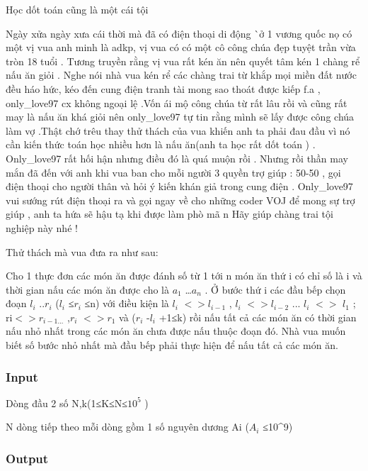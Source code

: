 



   Học dốt toán cũng là một cái tội  



   Ngày xửa ngày xưa cái thời mà đã có điện thoại di động ^^ ở 1 vương quốc nọ có một vị vua anh minh là adkp, vị vua có có một cô công chúa đẹp tuyệt trần vừa tròn 18 tuổi . Tương truyền rằng vị vua rất kén ăn nên quyết tâm kén 1 chàng rể nấu ăn giỏi . Nghe nói nhà vua kén rể các chàng trai từ khắp mọi miền đất nước đều háo hức, kéo đến cung điện tranh tài mong sao thoát được kiếp f.a , only\_love97 cx không ngoại lệ .Vốn ái mộ công chúa từ rất lâu rồi và cũng rất may là nấu ăn khá giỏi nên only\_love97 tự tin rằng mình sẽ lấy được công chúa làm vợ .Thật chớ trêu thay thử thách của vua khiến anh ta phải đau đầu vì nó cần kiến thức toán học nhiều hơn là nấu ăn(anh ta học rất dốt toán ) . Only\_love97 rất hối hận nhưng điều đó là quá muộn rồi . Nhưng rồi thần may mắn đã đến với anh khi vua ban cho mỗi người 3 quyền trợ giúp : 50-50 , gọi điện thoại cho người thân và hỏi ý kiến khán giả trong cung điện . Only\_love97 vui sướng rút điện thoại ra và gọi ngay về cho những coder VOJ để mong sự trợ giúp , anh ta hứa sẽ hậu tạ khi được làm phò mã ^^. Hãy giúp chàng trai tội nghiệp này nhé !  

   Thử thách mà vua đưa ra như sau:  

   Cho 1 thực đơn các món ăn được đánh số từ 1 tới n món ăn thứ i có chỉ số là i và thời gian nấu các món ăn được cho là $a_{1}$   …$a_{n}$   . Ở bước thứ i các đầu bếp chọn đoạn $l_{i}$   ..$r_{i}$   ($l_{i}$   ≤$r_{i}$   ≤n) với điều kiện là $l_{i}$   $<$$>$$l_{i-1}$   , $l_{i}$   $<$$>$$l_{i-2}$   ... $l_{i}$   $<$$>$ $l_{1}$   ; ri$<$$>$$r_{i-1...}$   ,$r_{i}$   $<$$>$$r_{1}$   và ($r_{i}$   -$l_{i}$   +1≤k) rồi nấu tất cả các món ăn có thời gian nấu nhỏ nhất trong các món ăn chưa được nấu thuộc đoạn đó. Nhà vua muốn biết số bước nhỏ nhất mà đầu bếp phải thực hiện để nấu tất cả các món ăn.  

\subsubsection{   Input  }

   Dòng đầu 2 số N,k(1≤K≤N≤$10^{5}$   )  

   N dòng tiếp theo mỗi dòng gồm 1 số nguyên dương Ai ($A_{i}$   ≤10^9)  

\subsubsection{   Output  }

